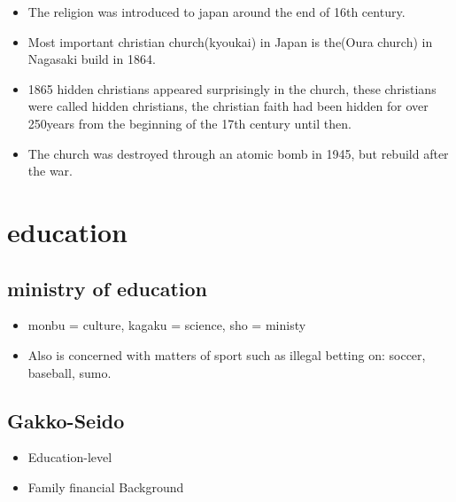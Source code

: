 \documentclass{article}
\newcommand\tabni[1][0.2cm]{\hspace*{#1}}
\begin{document}
\begin{enumerate}
\begin{itemize}
\item The religion was introduced to japan around the end of 16th century.
\item Most important christian church(kyoukai) in Japan is the(Oura church) in Nagasaki build in 1864.
\item 1865 hidden christians appeared surprisingly in the church, these christians were called hidden christians, the christian faith had been hidden for over 250years from the beginning of the 17th century until then.
\item The church was destroyed through an atomic bomb in 1945, but rebuild after the war. \\
\end{itemize}
\end{enumerate}

\section{ \tabni education}
\subsection{ ministry of education}
\begin{itemize}
\item monbu = culture,	kagaku = science, sho = ministy
\item Also is concerned with matters of sport such as illegal betting on: soccer, baseball, sumo.
\end{itemize}
\subsection{Gakko-Seido}
\begin{itemize}
\item Education-level
\item Family financial Background
\end{itemize}
\end{document}
